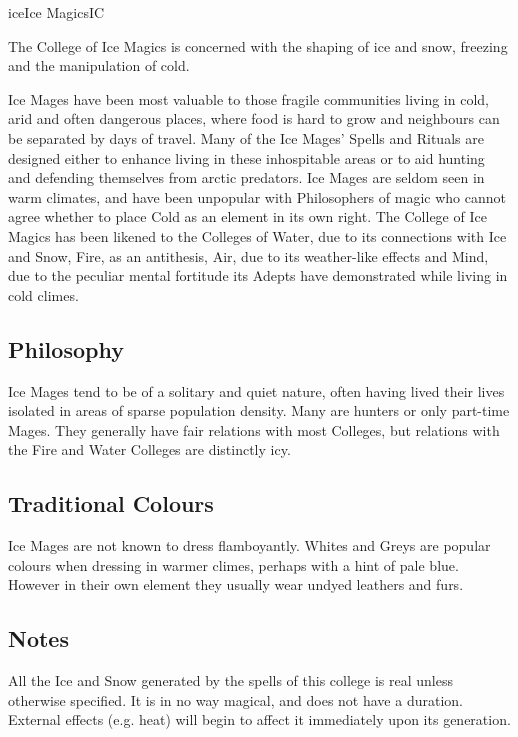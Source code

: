 \begin{College}[1.5]{ice}{Ice Magics}{IC}

The College of Ice Magics is concerned with the shaping of ice and
snow, freezing and the manipulation of cold.

Ice Mages have been most valuable to those fragile communities living
in cold, arid and often dangerous places, where food is hard to grow
and neighbours can be separated by days of travel.  Many of the Ice
Mages’ Spells and Rituals are designed either to enhance living in
these inhospitable areas or to aid hunting and defending themselves
from arctic predators. Ice Mages are seldom seen in warm climates, and
have been unpopular with Philosophers of magic who cannot agree
whether to place Cold as an element in its own right.  The College of
Ice Magics has been likened to the Colleges of Water, due to its
connections with Ice and Snow, Fire, as an antithesis, Air, due to its
weather-like effects and Mind, due to the peculiar mental fortitude
its Adepts have demonstrated while living in cold climes.

\subsection{Philosophy}

Ice Mages tend to be of a solitary and quiet nature, often having
lived their lives isolated in areas of sparse population density.
Many are hunters or only part-time Mages.  They generally have fair
relations with most Colleges, but relations with the Fire and Water
Colleges are distinctly icy.

\subsection{Traditional Colours}

Ice Mages are not known to dress flamboyantly.  Whites and Greys are
popular colours when dressing in warmer climes, perhaps with a hint of
pale blue.  However in their own element they usually wear undyed
leathers and furs.

\subsection{Notes}

All the Ice and Snow generated by the spells of this college is real
unless otherwise specified. It is in no way magical, and does not have
a duration. External effects (e.g. heat) will begin to affect it
immediately upon its generation.


\end{College}
